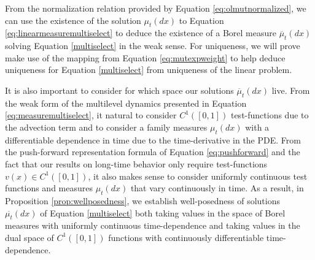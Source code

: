 \documentclass[11pt]{article}
\numberwithin{equation}{section}
\newcommand{\ol}{\overline}
\begin{document}
{From the normalization relation provided by Equation  \eqref{eq:olmutnormalized}, we can use the existence of the solution $\mu_t(dx)$ to Equation \eqref{eq:linearmeasuremultiselect} to deduce the existence of a Borel measure $\ol{\mu}_t(dx)$ solving Equation \eqref{multiselect} in the weak sense. For uniqueness, we will prove  make use of the mapping from Equation \eqref{eq:mutexpweight} to help deduce uniqueness for Equation \eqref{multiselect} from uniqueness of the linear problem.

It is also important to consider for which space our solutions $\ol{\mu}_t(dx)$ live. From the weak form of the multilevel dynamics presented in Equation \eqref{eq:measuremultiselect}, it natural to consider $C^1([0,1])$ test-functions due to the advection term and to consider a family measures $\mu_t(dx)$ with a differentiable dependence in time due to the time-derivative in the PDE. From the push-forward representation formula of Equation \eqref{eq:pushforward} and the fact that our results on long-time behavior only require test-functions $v(x) \in C^1([0,1])$, it also makes sense to consider uniformly continuous test functions and measures $\mu_t(dx)$ that vary continuously in time. As a result, in Proposition \ref{prop:wellposedness}, we establish well-posedness of solutions $\ol{\mu_t}(dx)$ of Equation \eqref{multiselect} both taking values in the space of Borel measures with uniformly continuous time-dependence and taking values in the dual space of $C^1([0,1])$ functions with continuously differentiable time-dependence.



}
\end{document}
